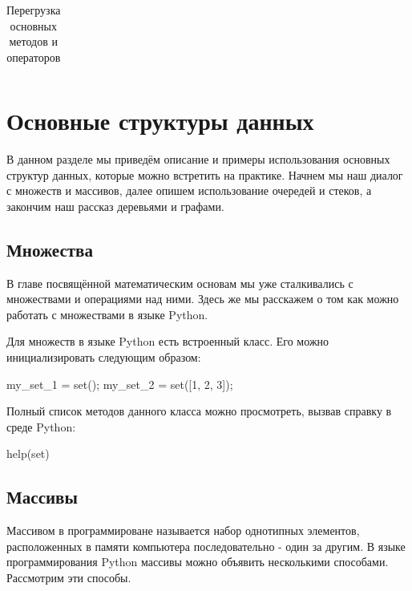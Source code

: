 \begin{table}[h!]
\begin{longtable}{|p{7cm}|p{8cm}|}



\end{longtable}
\caption{Перегрузка основных методов и операторов}
\label{tab:operators}
\end{table}

\chapter{Основные структуры данных}

В данном разделе мы приведём описание и примеры использования основных
структур данных, которые можно встретить на практике. Начнем мы наш 
диалог с множеств и массивов, далее опишем использование очередей и
стеков, а закончим наш рассказ деревьями и графами.

\section{Множества}

В главе посвящённой математическим основам мы уже сталкивались с
множествами и операциями над ними. Здесь же мы расскажем о том как 
можно работать с множествами в языке Python.

Для множеств в языке Python есть встроенный класс. Его можно инициализировать
следующим образом:

\begin{python}
my_set_1 = set();
my_set_2 = set([1, 2, 3]);
\end{python}

Полный список методов данного класса можно просмотреть, вызвав 
справку в среде Python:

\begin{python}
help(set)
\end{python}

\section{Массивы}

Массивом в программироване называется набор однотипных элементов,
расположенных в памяти компьютера последовательно - один за другим.
В языке программирования Python массивы можно объявить несколькими 
способами. Рассмотрим эти способы. 

